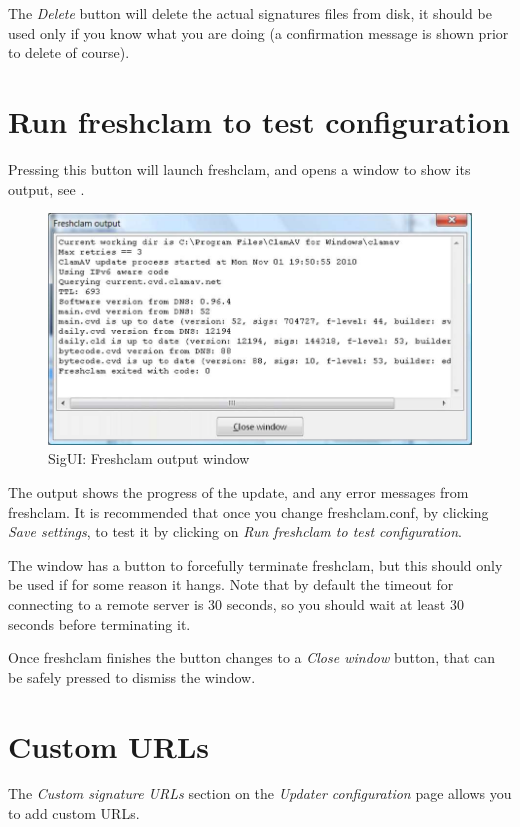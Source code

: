 The \emph{Delete} button will delete the actual signatures files from disk, it should be used only if you know what you are doing (a confirmation message is shown prior to delete of course).

\section{Run freshclam to test configuration}
\label{sec:runfreshclam}

Pressing this button will launch \gls{freshclam}, and opens a window to show its output, see .

\begin{figure}
\centering
\includegraphics{sigui_run.jpg}
\caption{SigUI: Freshclam output window}
\label{fig:freshclamout}
\end{figure}

The output shows the progress of the update, and any error messages from \gls{freshclam}.
It is recommended that once you change \gls{freshclam.conf}, by clicking \emph{Save settings}, to test it by clicking on \emph{Run freshclam to test configuration}.

The window has a button to forcefully terminate \gls{freshclam}, but this should only be used if for some reason it hangs. Note that by default the timeout for connecting to a remote server is 30 seconds, so you should wait at least 30 seconds before terminating it.

Once \gls{freshclam} finishes the button changes to a \emph{Close window} button, that can be safely pressed to dismiss the window.

\section{Custom URLs}
\label{sec:ui_urladd}
The \emph{Custom signature URLs} section on the \emph{Updater configuration}
page allows you to add custom URLs.

